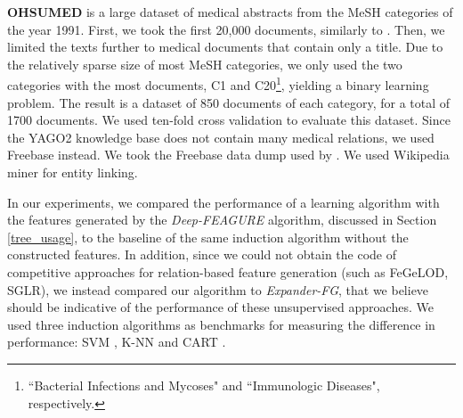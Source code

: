 \documentclass[twoside,11pt]{article}
\theoremstyle{definition}
\begin{document}

\textbf{OHSUMED}  is a large dataset of medical abstracts from the MeSH categories of the year 1991. 
First, we took the first 20,000 documents, similarly to .
Then, we limited the texts further to medical documents that contain only a title. %
Due to the relatively sparse size of most MeSH categories, we only used the two categories with the most documents, C1 and C20\footnote{``Bacterial Infections and Mycoses" and ``Immunologic Diseases", respectively.}, yielding a binary learning problem.
The result is a dataset of 850 documents of each category, for a total of 1700 documents.
We used ten-fold cross validation to evaluate this dataset.
Since the YAGO2 knowledge base does not contain many medical relations, we used Freebase instead. We took the Freebase data dump used by .
We used Wikipedia miner \cite{milne2013open} for entity linking. 

In our experiments, we compared the performance of a learning algorithm with the features generated by the \emph{Deep-FEAGURE} algorithm, discussed in Section \ref{tree_usage}, to the baseline of the same induction algorithm without the constructed features. In addition, since we could not obtain the code of competitive approaches for relation-based feature generation (such as FeGeLOD, SGLR), we instead compared our algorithm to \emph{Expander-FG}, that we believe should be indicative of the performance of these unsupervised approaches.
We used three induction algorithms as benchmarks for measuring the difference in performance: SVM \cite{cortes1995support}, K-NN \cite{fix1951discriminatory} and CART \cite{breiman1984classification}.


 
\end{document}
